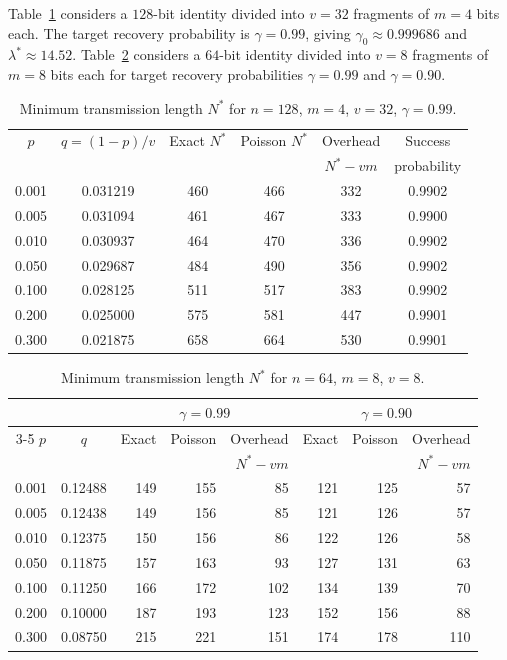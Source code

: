 \documentclass[a4paper,11pt]{llncs}
\begin{document}
{\small
\begin{example}
Table~\ref{tab:multipart} considers a $128$-bit identity divided into
$v=32$ fragments of $m=4$ bits each. The target recovery probability is
$\gamma=0.99$, giving
$\gamma_0\approx0.999686$ and
$\lambda^*\approx14.52$.
%
Table~\ref{tab:multipart-64} considers a $64$-bit identity divided into
$v=8$ fragments of $m=8$ bits each for target recovery probabilities
$\gamma=0.99$ and $\gamma=0.90$.
%
\begin{table}[ht]
\centering
\caption{Minimum transmission length $N^*$ for $n=128$, $m=4$, $v=32$,
$\gamma=0.99$.}
\label{tab:multipart}
\renewcommand{\arraystretch}{1.15}
\begin{tabular}{cccccc}
\hline
$p$ & $q=(1-p)/v$ & Exact $N^*$ & Poisson $N^*$ & Overhead & Success \\
&&&&$N^*-vm$& probability\\
\hline
0.001 & 0.031219 & 460 & 466 & 332 & 0.9902\\
0.005 & 0.031094 & 461 & 467 & 333 & 0.9900\\
0.010 & 0.030937 & 464 & 470 & 336 & 0.9902\\
0.050 & 0.029687 & 484 & 490 & 356 & 0.9902\\
0.100 & 0.028125 & 511 & 517 & 383 & 0.9902\\
0.200 & 0.025000 & 575 & 581 & 447 & 0.9901\\
0.300 & 0.021875 & 658 & 664 & 530 & 0.9901\\
\hline
\end{tabular}
\end{table}
%
\begin{table}[ht]
\centering
\caption{Minimum transmission length $N^*$ for $n=64$, $m=8$, $v=8$.}
\label{tab:multipart-64}
\renewcommand{\arraystretch}{1.15}
\begin{tabular}{ccrrrrrr}
\hline
&&\multicolumn{3}{c}{$\gamma=0.99$}&
\multicolumn{3}{c}{$\gamma=0.90$}\\
\cline{3-5}\cline{6-8}
$p$ & $q$
& Exact
& Poisson
& Overhead
& Exact
& Poisson
& Overhead\\
&&&&$N^*-vm$&&&$N^*-vm$\\
\hline
0.001 & 0.12488 & 149 & 155 & 85 & 121 & 125 & 57\\
0.005 & 0.12438 & 149 & 156 & 85 & 121 & 126 & 57\\
0.010 & 0.12375 & 150 & 156 & 86 & 122 & 126 & 58\\
0.050 & 0.11875 & 157 & 163 & 93 & 127 & 131 & 63\\
0.100 & 0.11250 & 166 & 172 & 102 & 134 & 139 & 70\\
0.200 & 0.10000 & 187 & 193 & 123 & 152 & 156 & 88\\
0.300 & 0.08750 & 215 & 221 & 151 & 174 & 178 & 110\\
\hline
\end{tabular}
\end{table}
\end{example}
}
\end{document}
